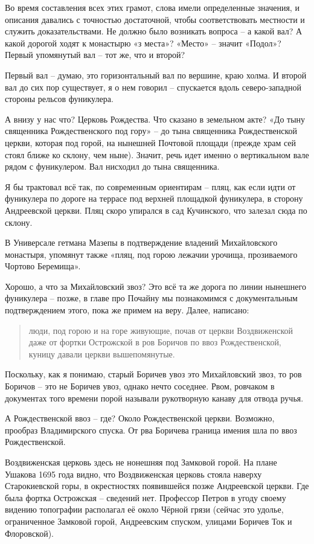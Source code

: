 Во время составления всех этих грамот, слова имели определенные значения, и описания давались с точностью достаточной, чтобы соответствовать местности и служить доказательствами. Не должно было возникать вопроса – а какой вал? А какой дорогой ходят к монастырю «з места»? «Место» – значит «Подол»? Первый упомянутый вал – тот же, что и второй?

Первый вал – думаю, это горизонтальный вал по вершине, краю холма. И второй вал до сих пор существует, я о нем говорил – спускается вдоль северо-западной стороны рельсов фуникулера. 

А внизу у нас что? Церковь Рождества. Что сказано в земельном акте? «До тыну священника  Рождественского под гору» – до тына священника Рождественской церкви, которая под горой, на нынешней Почтовой площади (прежде храм сей стоял ближе ко склону, чем ныне). Значит, речь идет именно о вертикальном вале рядом с фуникулером. Вал нисходил до тына священника.

Я бы трактовал всё так, по современным ориентирам – пляц, как если идти от фуникулера по дороге на террасе под верхней площадкой фуникулера, в сторону Андреевской церкви. Пляц скоро упирался в сад Кучинского, что залезал сюда по склону.

В Универсале гетмана Мазепы в подтверждение владений Михайловского монастыря, упомянут также «пляц, под горою лежачии урочища, прозиваемого Чортово Беремища».

Хорошо, а что за Михайловский звоз? Это всё та же дорога по линии нынешнего фуникулера – позже, в главе про Почайну мы познакомимся с документальным подтверждением этого, пока же примем на веру. Далее, написано: 

\begin{quotation}
люди, под горою и на горе живующие, почав от церкви Воздвиженской даже от фортки Острожской в ров Боричов по ввоз Рождественской, куницу давали церкви вышепомянутые.
\end{quotation}

Поскольку, как я понимаю, старый Боричев увоз это Михайловский звоз, то ров Боричов – это не Боричев увоз, однако нечто соседнее. Рвом, ровчаком в документах того времени порой называли рукотворную канаву для отвода ручья. 

А Рождественской ввоз – где? Около Рождественской церкви. Возможно, прообраз Владимирского спуска. От рва Боричева граница имения шла по ввоз Рождественской.

Воздвиженская церковь здесь не нонешняя под Замковой горой. На плане Ушакова 1695 года видно, что Воздвиженская церковь стояла наверху Старокиевской горы, в окрестностях появившейся позже Андреевской церкви. Где была фортка Острожская – сведений нет. Профессор Петров в угоду своему видению топографии располагал её около Чёрной грязи (сейчас это удолье,  ограниченное Замковой горой, Андреевским спуском, улицами Боричев Ток и Флоровской).

